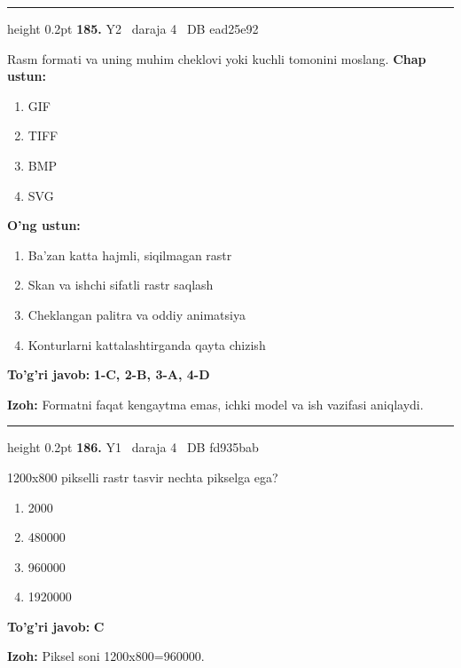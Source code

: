 \documentclass[10pt,a4paper,oneside]{article}
\begin{document}
\vspace{2mm}\hrule height 0.2pt \vspace{4mm}
\hypertarget{q185}{\textbf{\color{ink}185.}}  {\color{muted}\scriptsize Y2 \textbullet\ daraja 4 \textbullet\ DB ead25e92}
\par
Rasm formati va uning muhim cheklovi yoki kuchli tomonini moslang.
\textbf{\footnotesize Chap ustun:}
\begin{enumerate}[label=\arabic*),leftmargin=9mm]
\item GIF
\item TIFF
\item BMP
\item SVG
\end{enumerate}
\textbf{\footnotesize O'ng ustun:}
\begin{enumerate}[label=\Alph*),leftmargin=9mm]
\item Ba'zan katta hajmli, siqilmagan rastr
\item Skan va ishchi sifatli rastr saqlash
\item Cheklangan palitra va oddiy animatsiya
\item Konturlarni kattalashtirganda qayta chizish
\end{enumerate}
\begin{tcolorbox}[enhanced,breakable,colback=teal!4,colframe=teal!45!black,boxrule=0.45pt,arc=1.2mm,left=2.8mm,right=2.8mm,top=2mm,bottom=2mm,before skip=2mm,after skip=2mm]
\textbf{\color{teal}To'g'ri javob:} \textbf{1-C, 2-B, 3-A, 4-D}
\par\smallskip
\textbf{Izoh:} Formatni faqat kengaytma emas, ichki model va ish vazifasi aniqlaydi.
\end{tcolorbox}
\vspace{2mm}\hrule height 0.2pt \vspace{4mm}
\hypertarget{q186}{\textbf{\color{ink}186.}}  {\color{muted}\scriptsize Y1 \textbullet\ daraja 4 \textbullet\ DB fd935bab}
\par
1200x800 pikselli rastr tasvir nechta pikselga ega?
\begin{enumerate}[label=\Alph*),leftmargin=9mm]
\item 2000
\item 480000
\item 960000
\item 1920000
\end{enumerate}
\begin{tcolorbox}[enhanced,breakable,colback=teal!4,colframe=teal!45!black,boxrule=0.45pt,arc=1.2mm,left=2.8mm,right=2.8mm,top=2mm,bottom=2mm,before skip=2mm,after skip=2mm]
\textbf{\color{teal}To'g'ri javob:} \textbf{C}
\par\smallskip
\textbf{Izoh:} Piksel soni 1200x800=960000.
\end{tcolorbox}
\end{document}
